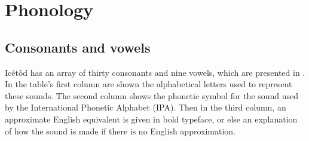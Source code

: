 \section{Phonology}\label{sec:2}
 
\subsection{Consonants and vowels}\label{sec:2.1}


Icétôd has an array of thirty consonants and nine vowels, which are presented in . In the table’s first column are shown the alphabetical letters used to represent these sounds. The second column shows the phonetic symbol for the sound used by the International Phonetic Alphabet (IPA). Then in the third column, an approximate English equivalent is given in bold typeface, or else an explanation of how the sound is made if there is no English approximation.


